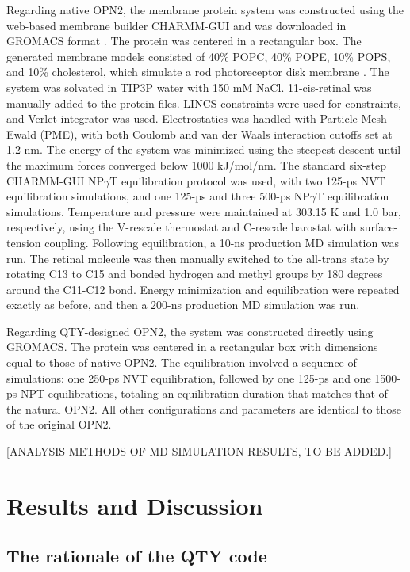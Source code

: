 \documentclass[fleqn, 10pt, lineno]{manuscript}
\begin{document}
Regarding native OPN2, the membrane protein system was constructed using the web-based membrane builder CHARMM-GUI and was downloaded in GROMACS format \citep{Jo_2008, Wu_2014, Lee_2016}. The protein was centered in a rectangular box. The generated membrane models consisted of 40\% POPC, 40\% POPE, 10\% POPS, and 10\% cholesterol, which simulate a rod photoreceptor disk membrane \citep{Albert_2005}. The system was solvated in TIP3P water with 150 mM NaCl. 11-cis-retinal was manually added to the protein files. LINCS constraints were used for constraints, and Verlet integrator was used. Electrostatics was handled with Particle Mesh Ewald (PME), with both Coulomb and van der Waals interaction cutoffs set at 1.2 nm. The energy of the system was minimized using the steepest descent until the maximum forces converged below 1000 kJ/mol/nm. The standard six-step CHARMM-GUI NP$\gamma$T equilibration protocol \citep{Jo_2008} was used, with two 125-ps NVT equilibration simulations, and one 125-ps and three 500-ps NP$\gamma$T equilibration simulations. Temperature and pressure were maintained at 303.15 K and 1.0 bar, respectively, using the V-rescale thermostat and C-rescale barostat with surface-tension coupling. Following equilibration, a 10-ns production MD simulation was run. The retinal molecule was then manually switched to the all-trans state by rotating C13 to C15 and bonded hydrogen and methyl groups by 180 degrees around the C11-C12 bond. Energy minimization and equilibration were repeated exactly as before, and then a 200-ns production MD simulation was run. 

Regarding QTY-designed OPN2, the system was constructed directly using GROMACS. The protein was centered in a rectangular box with dimensions equal to those of native OPN2. The equilibration involved a sequence of simulations: one 250-ps NVT equilibration, followed by one 125-ps and one 1500-ps NPT equilibrations, totaling an equilibration duration that matches that of the natural OPN2. All other configurations and parameters are identical to those of the original OPN2.

[ANALYSIS METHODS OF MD SIMULATION RESULTS, TO BE ADDED.]

\section*{Results and Discussion}

\subsection*{The rationale of the QTY code}
\end{document}
